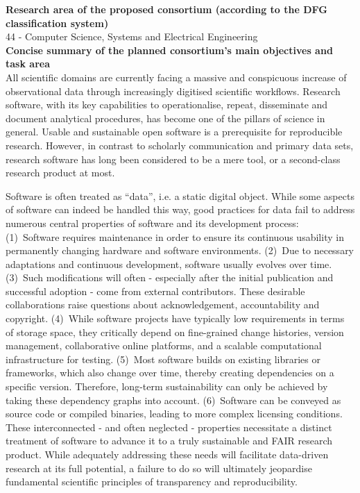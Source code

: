\documentclass[11pt,a4paper,DIV=11]{scrlttr2}
\begin{document}
\begin{letter}{}
\clearpage
{}

\textbf{Research area of the proposed consortium (according to the DFG classification system)}\\

44 - Computer Science, Systems and Electrical Engineering\\

\textbf{Concise summary of the planned consortium’s main objectives and task area}\\

All scientific domains are currently facing a massive and conspicuous increase of observational data through increasingly digitised scientific workflows. Research software, with its key capabilities to operationalise, repeat, disseminate and document analytical procedures, has become one of the pillars of science in general. Usable and  sustainable open software is a prerequisite for reproducible research. However, in contrast to scholarly communication and primary data sets, research software has long been considered to be a mere tool, or a second-class research product at most.

Software is often treated as “data”, i.e. a static digital object. While some aspects of software can indeed be handled this way, good practices for data fail to address numerous central properties of software and its development process: (1)~Software requires maintenance in order to ensure its continuous usability in permanently changing hardware and software environments. (2)~Due to necessary adaptations and continuous development, software usually evolves over time. (3)~Such modifications will often - especially after the initial publication and successful adoption - come from external contributors. These desirable collaborations raise questions about acknowledgement, accountability and copyright. (4)~While software projects have typically low requirements in terms of storage space, they critically depend on fine-grained change histories, version management, collaborative online platforms, and a scalable computational infrastructure for testing. (5)~Most software builds on existing libraries or frameworks, which also change over time, thereby creating dependencies on a specific version. Therefore, long-term sustainability can only be achieved by taking these dependency graphs into account. (6)~Software can be conveyed as source code or compiled binaries, leading to more complex licensing conditions. These interconnected - and often neglected - properties necessitate a distinct treatment of software to advance it to a truly sustainable and FAIR research product. While adequately addressing these needs will facilitate data-driven research at its full potential, a failure to do so will ultimately jeopardise fundamental scientific principles of transparency and reproducibility.


\end{letter}
\end{document}
